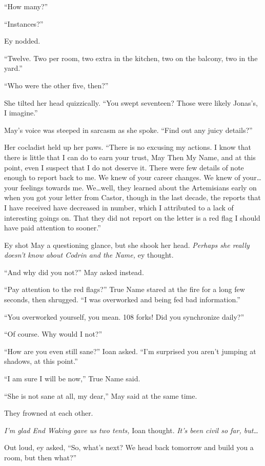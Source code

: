 ``How many?''

``Instances?''

Ey nodded.

``Twelve. Two per room, two extra in the kitchen, two on the balcony, two in the yard.''

``Who were the other five, then?''

She tilted her head quizzically. ``You swept seventeen? Those were likely Jonas's, I imagine.''

May's voice was steeped in sarcasm as she spoke. ``Find out any juicy details?''

Her cocladist held up her paws. ``There is no excusing my actions. I know that there is little that I can do to earn your trust, May Then My Name, and at this point, even I suspect that I do not deserve it. There were few details of note enough to report back to me. We knew of your career changes. We knew of your\ldots your feelings towards me. We\ldots well, they learned about the Artemisians early on when you got your letter from Castor, though in the last decade, the reports that I have received have decreased in number, which I attributed to a lack of interesting goings on. That they did not report on the letter is a red flag I should have paid attention to sooner.''

Ey shot May a questioning glance, but she shook her head. \emph{Perhaps she really doesn't know about Codrin and the Name,} ey thought.

``And why did you not?'' May asked instead.

``Pay attention to the red flags?'' True Name stared at the fire for a long few seconds, then shrugged. ``I was overworked and being fed bad information.''

``You overworked yourself, you mean. 108 forks! Did you synchronize daily?''

``Of course. Why would I not?''

``How are you even still sane?'' Ioan asked. ``I'm surprised you aren't jumping at shadows, at this point.''

``I am sure I will be now,'' True Name said.

``She is not sane at all, my dear,'' May said at the same time.

They frowned at each other.

\emph{I'm glad End Waking gave us two tents,} Ioan thought. \emph{It's been civil so far, but\ldots{}}

Out loud, ey asked, ``So, what's next? We head back tomorrow and build you a room, but then what?''

